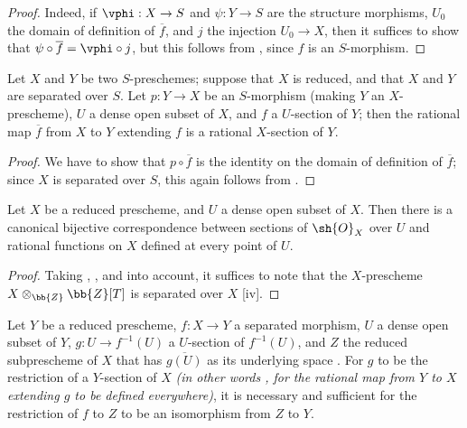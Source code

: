\begin{proof}
Indeed, if $\vphi:X\to S$ and $\psi:Y\to S$ are the structure morphisms, $U_0$ the domain of definition of $\overline{f}$, and $j$ the injection $U_0\to X$, then it suffices to show that $\psi\circ\overline{f}=\vphi\circ j$, but this follows from , since $f$ is an $S$-morphism.
\end{proof}

\begin{corollary}[7.2.5]
\label{I.7.2.5}
Let $X$ and $Y$ be two $S$-preschemes; suppose that $X$ is reduced, and that $X$ and $Y$ are separated over $S$.
Let $p:Y\to X$ be an $S$-morphism (making $Y$ an $X$-prescheme), $U$ a dense open subset of $X$, and $f$ a $U$-section of $Y$; then the rational map $\overline{f}$ from $X$ to $Y$ extending $f$ is a rational $X$-section of $Y$.
\end{corollary}

\begin{proof}
We have to show that $p\circ\overline{f}$ is the identity on the domain of definition of $\overline{f}$; since $X$ is separated over $S$, this again follows from .
\end{proof}

\begin{corollary}[7.2.6]
\label{I.7.2.6}
Let $X$ be a reduced prescheme, and $U$ a dense open subset of $X$.
Then there is a canonical bijective correspondence between sections of $\sh{O}_X$ over $U$ and rational functions on $X$ defined at every point of $U$.
\end{corollary}

\begin{proof}
Taking , , and  into account, it suffices to note that the $X$-prescheme $X\otimes_{\bb{Z}}\bb{Z}[T]$ is separated over $X$ [iv].
\end{proof}

\begin{corollary}[7.2.7]
\label{I.7.2.7}
Let $Y$ be a reduced prescheme, $f:X\to Y$ a separated morphism, $U$ a dense open subset of $Y$, $g:U\to f^{-1}(U)$ a $U$-section of $f^{-1}(U)$, and $Z$ the reduced subprescheme of $X$ that has $\overline{g(U)}$ as its underlying space .
For $g$ to be the restriction of a $Y$-section of $X$ \emph{(in other words , for the rational map from $Y$ to $X$ extending $g$ to be defined everywhere)}, it is necessary and sufficient for the restriction of $f$ to $Z$ to be an isomorphism from $Z$ to $Y$.
\end{corollary}

